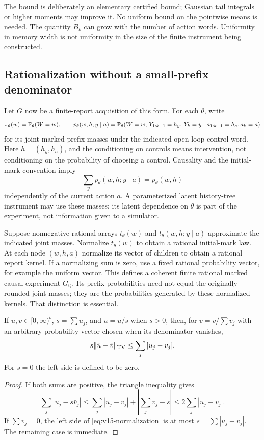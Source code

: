 The bound is deliberately an elementary certified bound; Gaussian tail
integrals or higher moments may improve it. No uniform bound on the
pointwise means is needed. The quantity $B_k$ can grow with the number
of action words. Uniformity in memory width is not uniformity in the
size of the finite instrument being constructed.

\subsection{Rationalization without a small-prefix denominator}
Let $G$ now be a finite-report acquisition of this form. For each
$\theta$, write
\[
 \pi_\theta(w)=\mathbb P_\theta(W=w),\qquad
 p_\theta(w,h;y\mid a)
       =\mathbb P_\theta(W=w,\,Y_{1:k-1}=h_y,\,Y_k=y
                         \mid a_{1:k-1}=h_a,a_k=a)
\]
for its joint marked prefix masses under the indicated open-loop
control word. Here $h=(h_y,h_a)$, and the conditioning on controls means
intervention, not conditioning on the probability of choosing a control.
Causality and the initial-mark convention imply
\[
 \sum_y p_\theta(w,h;y\mid a)=p_\theta(w,h)
\]
independently of the current action $a$. A parameterized latent
history-tree instrument may use these masses; its latent dependence
on $\theta$ is part of the experiment, not information given to a
simulator.

Suppose nonnegative rational arrays $t_\theta(w)$ and
$t_\theta(w,h;y\mid a)$ approximate the indicated joint masses.
Normalize $t_\theta(w)$ to obtain a rational initial-mark law. At each
node $(w,h,a)$ normalize its vector of children to obtain a rational
report kernel. If a normalizing sum is zero, use a fixed rational
probability vector, for example the uniform vector. This defines a
coherent finite rational marked causal experiment $G_{\mathbb Q}$.
Its prefix probabilities need not equal the originally rounded joint
masses; they are the probabilities generated by these normalized
kernels. That distinction is essential.

\begin{lemma}\label{lem:v15-normalization}
If $u,v\in[0,\infty)^b$, $s=\sum u_j$, and $\bar u=u/s$ when $s>0$,
then, for $\bar v=v/\sum v_j$ with an arbitrary probability vector
chosen when its denominator vanishes,
\begin{equation}\label{eq:v15-normalization}
 s\|\bar u-\bar v\|_{\rm TV}\le\sum_j|u_j-v_j|.
\end{equation}
For $s=0$ the left side is defined to be zero.
\end{lemma}
\begin{proof}
If both sums are positive, the triangle inequality gives
\[
 \sum_j|u_j-s\bar v_j|
 \le\sum_j|u_j-v_j|+|\sum_jv_j-s|
 \le2\sum_j|u_j-v_j|.
\]
If $\sum v_j=0$, the left side of \eqref{eq:v15-normalization} is
at most $s=\sum|u_j-v_j|$. The remaining case is immediate.
\end{proof}

